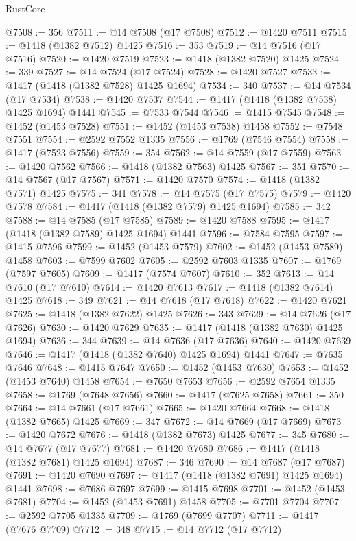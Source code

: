 \begin{lexlean}{RustCore}
\begin{coremodule}
@7508 := 356
@7511 := @14 @7508 (@17 @7508)
@7512 := @1420 @7511
@7515 := @1418 (@1382 @7512) @1425
@7516 := 353
@7519 := @14 @7516 (@17 @7516)
@7520 := @1420 @7519
@7523 := @1418 (@1382 @7520) @1425
@7524 := 339
@7527 := @14 @7524 (@17 @7524)
@7528 := @1420 @7527
@7533 := @1417 (@1418 (@1382 @7528) @1425 @1694)
@7534 := 340
@7537 := @14 @7534 (@17 @7534)
@7538 := @1420 @7537
@7544 := @1417 (@1418 (@1382 @7538) @1425 @1694) @1441
@7545 := @7533 @7544
@7546 := @1415 @7545
@7548 := @1452 (@1453 @7528)
@7551 := @1452 (@1453 @7538) @1458
@7552 := @7548 @7551
@7554 := @2592 @7552 @1335
@7556 := @1769 (@7546 @7554)
@7558 := @1417 (@7523 @7556)
@7559 := 354
@7562 := @14 @7559 (@17 @7559)
@7563 := @1420 @7562
@7566 := @1418 (@1382 @7563) @1425
@7567 := 351
@7570 := @14 @7567 (@17 @7567)
@7571 := @1420 @7570
@7574 := @1418 (@1382 @7571) @1425
@7575 := 341
@7578 := @14 @7575 (@17 @7575)
@7579 := @1420 @7578
@7584 := @1417 (@1418 (@1382 @7579) @1425 @1694)
@7585 := 342
@7588 := @14 @7585 (@17 @7585)
@7589 := @1420 @7588
@7595 := @1417 (@1418 (@1382 @7589) @1425 @1694) @1441
@7596 := @7584 @7595
@7597 := @1415 @7596
@7599 := @1452 (@1453 @7579)
@7602 := @1452 (@1453 @7589) @1458
@7603 := @7599 @7602
@7605 := @2592 @7603 @1335
@7607 := @1769 (@7597 @7605)
@7609 := @1417 (@7574 @7607)
@7610 := 352
@7613 := @14 @7610 (@17 @7610)
@7614 := @1420 @7613
@7617 := @1418 (@1382 @7614) @1425
@7618 := 349
@7621 := @14 @7618 (@17 @7618)
@7622 := @1420 @7621
@7625 := @1418 (@1382 @7622) @1425
@7626 := 343
@7629 := @14 @7626 (@17 @7626)
@7630 := @1420 @7629
@7635 := @1417 (@1418 (@1382 @7630) @1425 @1694)
@7636 := 344
@7639 := @14 @7636 (@17 @7636)
@7640 := @1420 @7639
@7646 := @1417 (@1418 (@1382 @7640) @1425 @1694) @1441
@7647 := @7635 @7646
@7648 := @1415 @7647
@7650 := @1452 (@1453 @7630)
@7653 := @1452 (@1453 @7640) @1458
@7654 := @7650 @7653
@7656 := @2592 @7654 @1335
@7658 := @1769 (@7648 @7656)
@7660 := @1417 (@7625 @7658)
@7661 := 350
@7664 := @14 @7661 (@17 @7661)
@7665 := @1420 @7664
@7668 := @1418 (@1382 @7665) @1425
@7669 := 347
@7672 := @14 @7669 (@17 @7669)
@7673 := @1420 @7672
@7676 := @1418 (@1382 @7673) @1425
@7677 := 345
@7680 := @14 @7677 (@17 @7677)
@7681 := @1420 @7680
@7686 := @1417 (@1418 (@1382 @7681) @1425 @1694)
@7687 := 346
@7690 := @14 @7687 (@17 @7687)
@7691 := @1420 @7690
@7697 := @1417 (@1418 (@1382 @7691) @1425 @1694) @1441
@7698 := @7686 @7697
@7699 := @1415 @7698
@7701 := @1452 (@1453 @7681)
@7704 := @1452 (@1453 @7691) @1458
@7705 := @7701 @7704
@7707 := @2592 @7705 @1335
@7709 := @1769 (@7699 @7707)
@7711 := @1417 (@7676 @7709)
@7712 := 348
@7715 := @14 @7712 (@17 @7712)

\end{coremodule}
\end{lexlean}

